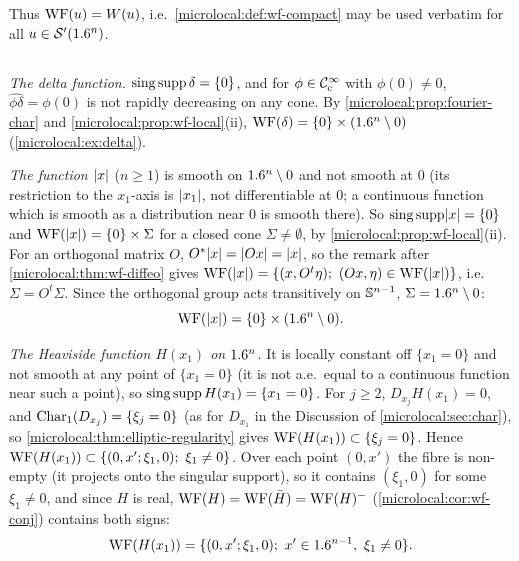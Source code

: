 Thus $\operatorname{WF}(u)=W(u)$, i.e.\ \cref{microlocal:def:wf-compact} may be used verbatim for all
$u\in\mathcal{S}'(1.6^n)$.

\subsection*{}
\emph{The delta function.} $\operatorname{sing\,supp}\delta=\{0\}$, and for $\phi\in\mathcal{C}^\infty_{\mathrm{c}}$ with $\phi(0)\ne0$,
$\widehat{\phi\delta}=\phi(0)$ is not rapidly decreasing on any cone. By
\cref{microlocal:prop:fourier-char} and \cref{microlocal:prop:wf-local}(ii),
$\operatorname{WF}(\delta)=\{0\}\times(1.6^n\setminus0)$ (\cref{microlocal:ex:delta}).

\emph{The function $\lvert x\rvert$} ($n\ge1$) is smooth on $1.6^n\setminus0$ and not smooth at $0$ (its
restriction to the $x_1$-axis is $\lvert x_1\rvert$, not differentiable at $0$; a continuous function
which is smooth as a distribution near $0$ is smooth there). So $\operatorname{sing\,supp}\lvert x\rvert=\{0\}$ and
$\operatorname{WF}(\lvert x\rvert)=\{0\}\times\Sigma$ for a closed cone $\Sigma\ne\emptyset$, by
\cref{microlocal:prop:wf-local}(ii). For an orthogonal matrix $O$, $O^*\lvert x\rvert=\lvert Ox\rvert=\lvert x\rvert$, so the
remark after \cref{microlocal:thm:wf-diffeo} gives
$\WF(\abs x)=\{(x,O^t\eta);\ (Ox,\eta)\in\WF(\abs x)\}$, i.e.\ $\Sigma=O^t\Sigma$. Since the orthogonal
group acts transitively on $\mathbb{S}^{n-1}$, $\Sigma=1.6^n\setminus0$:
\begin{equation*}
  \operatorname{WF}(\lvert x\rvert)=\{0\}\times(1.6^n\setminus0).
\end{equation*}

\emph{The Heaviside function $H(x_1)$ on $1.6^n$.} It is locally constant off $\{x_1=0\}$ and not
smooth at any point of $\{x_1=0\}$ (it is not a.e.\ equal to a continuous function near such a
point), so $\operatorname{sing\,supp} H(x_1)=\{x_1=0\}$. For $j\ge2$, $D_{x_j}H(x_1)=0$, and
$\operatorname{Char}_1(D_{x_j})=\{\xi_j=0\}$ (as for $D_{x_1}$ in the Discussion of \cref{microlocal:sec:char}),
so \cref{microlocal:thm:elliptic-regularity} gives $\operatorname{WF}(H(x_1))\subset\{\xi_j=0\}$. Hence
$\WF(H(x_1))\subset\{(0,x';\xi_1,0);\ \xi_1\ne0\}$. Over each point $(0,x')$ the fibre is non-empty
(it projects onto the singular support), so it contains $(\xi_1,0)$ for some $\xi_1\ne0$, and since
$H$ is real, $\operatorname{WF}(H)=\operatorname{WF}(\bar H)=\operatorname{WF}(H)^-$ (\cref{microlocal:cor:wf-conj}) contains both signs:
\begin{equation*}
  \WF(H(x_1))=\{(0,x';\xi_1,0);\ x'\in\R^{n-1},\ \xi_1\ne0\}.
\end{equation*}

